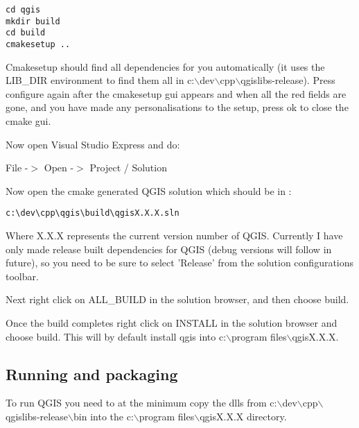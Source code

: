 \begin{verbatim}
cd qgis
mkdir build
cd build
cmakesetup ..
\end{verbatim}

Cmakesetup should find all dependencies for you automatically (it uses the 
LIB\_DIR environment to find them all in c:$\backslash$dev$\backslash$cpp$\backslash$qgislibs-release). 
Press configure again after the cmakesetup gui appears and when all the red 
fields are gone, and you have made any personalisations to the setup, press 
ok to close the cmake gui.

Now open Visual Studio Express and do:

File -$>$ Open -$>$ Project / Solution

Now open the cmake generated QGIS solution which should be in :

\begin{verbatim}
c:\dev\cpp\qgis\build\qgisX.X.X.sln
\end{verbatim}

Where X.X.X represents the current version number of QGIS. Currently I 
have only made release built dependencies for QGIS (debug versions will follow 
in future), so you need to be sure to select 'Release' from the solution 
configurations toolbar.

Next right click on ALL\_BUILD in the solution browser, and then choose build.

Once the build completes right click on INSTALL in the solution browser and 
choose build. This will by default install qgis into c:$\backslash$program files$\backslash$qgisX.X.X.

\subsection{Running and packaging}
To run QGIS you need to at the minimum copy the dlls from c:$\backslash$dev$\backslash$cpp$\backslash$qgislibs-release$\backslash$bin 
into the c:$\backslash$program files$\backslash$qgisX.X.X directory.


